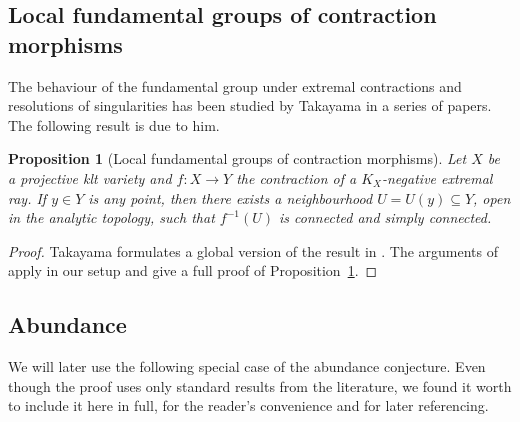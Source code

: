 \documentclass[JEP,XML,SOM,Unicode,published]{cedram}
\theoremstyle{plain}
\newtheorem{prop}[thm]{Proposition}
\theoremstyle{definition}
\numberwithin{equation}{thm}
\numberwithin{enumi}{thm}
\begin{document}
\subsection{Local fundamental groups of contraction morphisms}

The behaviour of the fundamental group under extremal contractions and
resolutions of singularities has been studied by Takayama in a series of papers.
The following result is due to him.

\begin{prop}[Local fundamental groups of contraction morphisms]\label{prop:takayama}
Let $X$ be a projective klt variety and $f : X \to Y$ the contraction of a
$K_X$-negative extremal ray. If $y \in Y$ is any point, then there exists a
neighbourhood $U = U(y) \subseteq Y$, open in the analytic topology, such that
$f^{-1}(U)$ is connected and simply connected.
\end{prop}
\begin{proof}
Takayama formulates a global version of the result in
\cite[Th.\,1.2]{Takayama2003}. The arguments of \cite[Proof of Th.\,1.2 on
p.\,834]{Takayama2003} apply in our setup and give a full proof of
Proposition~\ref{prop:takayama}.
\end{proof}

\subsection{Abundance}

We will later use the following special case of the abundance conjecture. Even
though the proof uses only standard results from the literature, we found it
worth to include it here in full, for the reader's convenience and for later
referencing.
\end{document}

